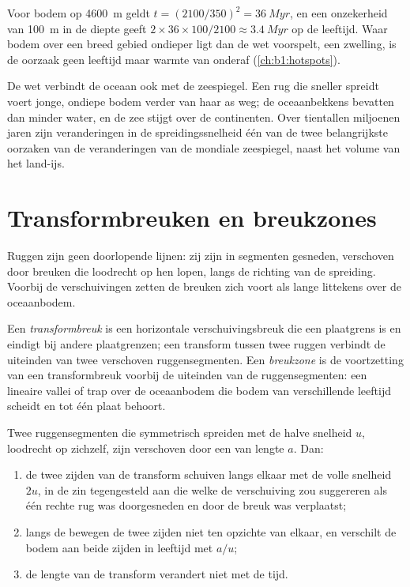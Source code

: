 Voor bodem op \qty{4600}{m} geldt $t = (2100/350)^2 = \qty{36}{Myr}$, en een onzekerheid van \qty{100}{m} in de diepte geeft $2\times36\times100/2100 \approx
\qty{3.4}{Myr}$ op de leeftijd. Waar bodem over een breed gebied ondieper ligt dan de wet voorspelt, een zwelling, is de oorzaak geen leeftijd maar warmte van onderaf (\cref{ch:b1:hotspots}).

De wet verbindt de oceaan ook met de zeespiegel. Een rug die sneller spreidt voert jonge, ondiepe bodem verder van haar as weg; de oceaanbekkens bevatten dan minder water, en de zee stijgt over de continenten. Over tientallen miljoenen jaren zijn veranderingen in de spreidingssnelheid één van de twee belangrijkste oorzaken van de veranderingen van de mondiale zeespiegel, naast het volume van het land-ijs.

\section{Transformbreuken en breukzones}

Ruggen zijn geen doorlopende lijnen: zij zijn in segmenten gesneden, verschoven door breuken die loodrecht op hen lopen, langs de richting van de spreiding. Voorbij de verschuivingen zetten de breuken zich voort als lange littekens over de oceaanbodem.

\begin{definition}\label{def:b1:rifts-ridges-margins:transform}
Een \emph{transformbreuk} is een horizontale verschuivingsbreuk die een plaatgrens is en eindigt bij andere plaatgrenzen; een transform tussen twee ruggen verbindt de uiteinden van twee verschoven ruggensegmenten. Een \emph{breukzone} is de voortzetting van een transformbreuk voorbij de uiteinden van de ruggensegmenten: een lineaire vallei of trap over de oceaanbodem die bodem van verschillende leeftijd scheidt en tot één plaat behoort.
\end{definition}

\begin{proposition}\label{prop:b1:rifts-ridges-margins:transform}
Twee ruggensegmenten die symmetrisch spreiden met de halve snelheid $u$, loodrecht op zichzelf, zijn verschoven door een  van lengte $a$. Dan:
\begin{enumerate}
  \item de twee zijden van de transform schuiven langs elkaar met de volle snelheid $2u$, in de zin tegengesteld aan die welke de verschuiving zou suggereren als één rechte rug was doorgesneden en door de breuk was verplaatst;
  \item langs de  bewegen de twee zijden niet ten opzichte van elkaar, en verschilt de bodem aan beide zijden in leeftijd met $a/u$;
  \item de lengte van de transform verandert niet met de tijd.
\end{enumerate}
\end{proposition}

